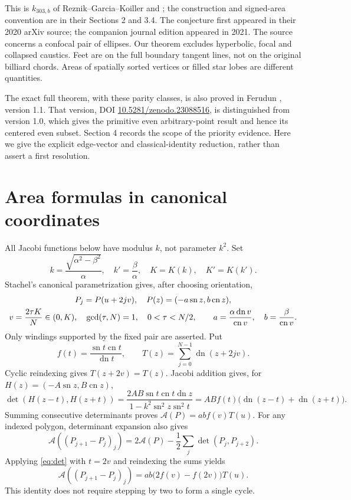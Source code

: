 \documentclass[11pt]{article}
\newcommand{\sn}{\operatorname{sn}}
\newcommand{\cn}{\operatorname{cn}}
\newcommand{\dn}{\operatorname{dn}}
\newcommand{\Area}{\mathcal A}
\begin{document}
This is $k_{303,b}$ of Reznik--Garcia--Koiller
\cite[Table 4, p.~6]{RGK} and \cite[Table 4, p.~346]{RGKfinal};
the construction and signed-area convention are in their Sections 2 and 3.4.
The conjecture first appeared in their 2020 arXiv source; the companion
journal edition appeared in 2021. The source concerns a confocal pair of
ellipses. Our theorem excludes hyperbolic, focal and collapsed caustics.
Feet are on the full boundary tangent lines, not on the original billiard
chords. Areas of spatially sorted vertices or filled star lobes are different
quantities.

The exact full theorem, with these parity classes, is also proved in
Ferudun \cite[Theorem 2 and Section 6]{Ferudun}, version 1.1. That version,
DOI \href{https://doi.org/10.5281/zenodo.23088516}{10.5281/zenodo.23088516},
is distinguished from version 1.0, which gives the primitive even
arbitrary-point result and hence its centered even subset. Section 4 records
the scope of the priority evidence. Here we give the explicit edge-vector
and classical-identity reduction, rather than assert a first resolution.

\section{Area formulas in canonical coordinates}
All Jacobi functions below have modulus $k$, not parameter $k^2$. Set
\[
 k=\frac{\sqrt{\alpha^2-\beta^2}}{\alpha},\quad
 k'=\frac{\beta}{\alpha},\quad K=K(k),\quad K'=K(k').
\]
Stachel's canonical parametrization
\cite[Theorem 4.3, equation (4.9), p.~1614]{Stachel} gives, after choosing
orientation,
\begin{gather}\label{eq:canonical}
 P_j=P(u+2jv),\quad P(z)=(-a\sn z,b\cn z),\\
 v=\frac{2\tau K}{N}\in(0,K),\quad \gcd(\tau,N)=1,\quad
 0<\tau<N/2,\qquad
 a=\frac{\alpha\dn v}{\cn v},\quad b=\frac{\beta}{\cn v}.\notag
\end{gather}
Only windings supported by the fixed pair are asserted. Put
\[
 f(t)=\frac{\sn t\cn t}{\dn t},\qquad
 T(z)=\sum_{j=0}^{N-1}\dn(z+2jv).
\]
Cyclic reindexing gives $T(z+2v)=T(z)$. Jacobi addition
\cite[Section 22.8]{DLMF} gives, for $H(z)=(-A\sn z,B\cn z)$,
\begin{equation}\label{eq:det}
 \det(H(z-t),H(z+t))
 =\frac{2AB\sn t\cn t\dn z}{1-k^2\sn^2z\sn^2t}
 =ABf(t)\bigl(\dn(z-t)+\dn(z+t)\bigr).
\end{equation}
Summing consecutive determinants proves $\Area(P)=abf(v)T(u)$.
For any indexed polygon, determinant expansion also gives
\[
 \Area((P_{j+1}-P_j)_j)
 =2\Area(P)-\frac12\sum_j\det(P_j,P_{j+2}).
\]
Applying \eqref{eq:det} with $t=2v$ and reindexing the sums yields
\begin{equation}\label{eq:edge}
 \Area((P_{j+1}-P_j)_j)=ab\bigl(2f(v)-f(2v)\bigr)T(u).
\end{equation}
This identity does not require stepping by two to form a single cycle.
\end{document}
